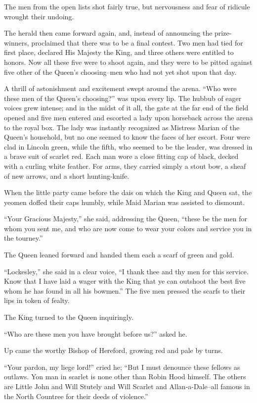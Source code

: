 The men from the open lists shot fairly true, but nervousness and fear
of ridicule wrought their undoing.

The herald then came forward again, and, instead of announcing the
prize-winners, proclaimed that there was to be a final contest. Two men
had tied for first place, declared His Majesty the King, and three
others were entitled to honors. Now all these five were to shoot again,
and they were to be pitted against five other of the Queen's
choosing--men who had not yet shot upon that day.

A thrill of astonishment and excitement swept around the arena. ``Who
were these men of the Queen's choosing?'' was upon every lip. The hubbub
of eager voices grew intense; and in the midst of it all, the gate at
the far end of the field opened and five men entered and escorted a lady
upon horseback across the arena to the royal box. The lady was instantly
recognized as Mistress Marian of the Queen's household, but no one
seemed to know the faces of her escort. Four were clad in Lincoln green,
while the fifth, who seemed to be the leader, was dressed in a brave
suit of scarlet red. Each man wore a close fitting cap of black, decked
with a curling white feather. For arms, they carried simply a stout bow,
a sheaf of new arrows, and a short hunting-knife.

When the little party came before the dais on which the King and Queen
sat, the yeomen doffed their caps humbly, while Maid Marian was assisted
to dismount.

``Your Gracious Majesty,'' she said, addressing the Queen, ``these be
the men for whom you sent me, and who are now come to wear your colors
and service you in the tourney.''

The Queen leaned forward and handed them each a scarf of green and gold.

``Lockesley,'' she said in a clear voice, ``I thank thee and thy men for
this service. Know that I have laid a wager with the King that ye can
outshoot the best five whom he has found in all his bowmen.'' The five
men pressed the scarfs to their lips in token of fealty.

The King turned to the Queen inquiringly.

``Who are these men you have brought before us?'' asked he.

Up came the worthy Bishop of Hereford, growing red and pale by turns.

``Your pardon, my liege lord!'' cried he; ``But I must denounce these
fellows as outlaws. Yon man in scarlet is none other than Robin Hood
himself. The others are Little John and Will Stutely and Will Scarlet
and Allan-a-Dale--all famous in the North Countree for their deeds of
violence.''

